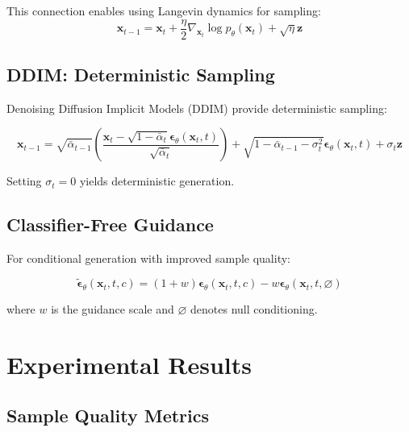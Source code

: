 \documentclass[11pt,a4paper]{article}
\theoremstyle{definition}
\begin{document}
This connection enables using Langevin dynamics for sampling:
\begin{equation}
    \mathbf{x}_{t-1} = \mathbf{x}_t + \frac{\eta}{2}\nabla_{\mathbf{x}_t} \log p_\theta(\mathbf{x}_t) + \sqrt{\eta}\mathbf{z}
\end{equation}

\subsection{DDIM: Deterministic Sampling}

Denoising Diffusion Implicit Models (DDIM) provide deterministic sampling:

\begin{equation}
    \mathbf{x}_{t-1} = \sqrt{\bar{\alpha}_{t-1}}\left(\frac{\mathbf{x}_t - \sqrt{1-\bar{\alpha}_t}\bm{\epsilon}_\theta(\mathbf{x}_t, t)}{\sqrt{\bar{\alpha}_t}}\right) + \sqrt{1-\bar{\alpha}_{t-1}-\sigma_t^2}\bm{\epsilon}_\theta(\mathbf{x}_t, t) + \sigma_t\mathbf{z}
\end{equation}

Setting $\sigma_t = 0$ yields deterministic generation.

\subsection{Classifier-Free Guidance}

For conditional generation with improved sample quality:

\begin{equation}
    \tilde{\bm{\epsilon}}_\theta(\mathbf{x}_t, t, c) = (1 + w)\bm{\epsilon}_\theta(\mathbf{x}_t, t, c) - w\bm{\epsilon}_\theta(\mathbf{x}_t, t, \varnothing)
\end{equation}

where $w$ is the guidance scale and $\varnothing$ denotes null conditioning.

\section{Experimental Results}

\subsection{Sample Quality Metrics}
\end{document}
